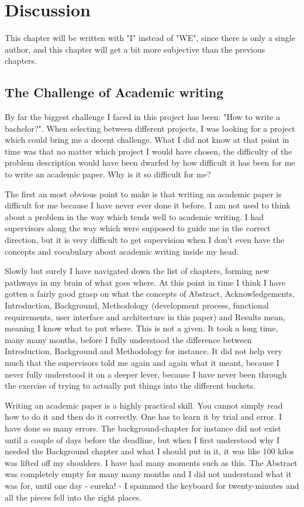 \hypertarget{discussion}{%
\chapter{Discussion}\label{discussion}}

This chapter will be written with "I" instead of "WE", since there is only a single author, and this chapter will get a bit more subjective than the previous chapters.


\section{The Challenge of Academic writing}

By far the biggest challenge I faced in this project has been: "How to write a bachelor?". When selecting between different projects, I was looking for a project which could bring me a decent challenge. What I did not know at that point in time was that no matter which project I would have chosen, the difficulty of the problem description would have been dwarfed by how difficult it has been for me to write an academic paper. Why is it so difficult for me?

The first an most obvious point to make is that writing an academic paper is difficult for me because I have never ever done it before. I am not used to think about a problem in the way which tends well to academic writing. I had supervisors along the way which were supposed to guide me in the correct direction, but it is very difficult to get supervision when I don't even have the concepts and vocabulary about academic writing inside my head.

Slowly but surely I have navigated down the list of chapters, forming new pathways in my brain of what goes where. At this point in time I think I have gotten a fairly good grasp on what the concepts of Abstract, Acknowledgements, Introduction, Background, Methodology (development process, functional requirements, user interface and architecture in this paper) and Results mean, meaning I know what to put where. This is not a given. It took a long time, many many months, before I fully understood the difference between Introduction, Background and Methodology for instance. It did not help very much that the supervisors told me again and again what it meant, because I never fully understood it on a deeper lever, because I have never been through the exercise of trying to actually put things into the different buckets.

Writing an academic paper is a highly practical skill. You cannot simply read how to do it and then do it correctly. One has to learn it by trial and error. I have done so many errors. The background-chapter for instance did not exist until a couple of days before the deadline, but when I first understood why I needed the Background chapter and what I should put in it, it was like 100 kilos was lifted off my shoulders. I have had many moments such as this. The Abstract was completely empty for many many months and I did not understand what it was for, until one day - eureka! - I spammed the keyboard for twenty-minutes and all the pieces fell into the right places.


